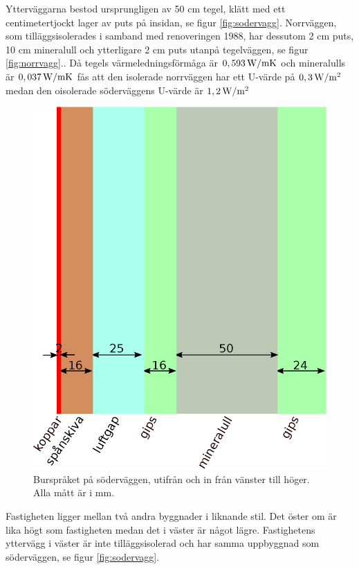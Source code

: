 Ytterväggarna bestod ursprungligen av 50 cm tegel, klätt med ett centimetertjockt lager av puts på insidan, se figur \ref{fig:sodervagg}. Norrväggen, som tilläggsisolerades i samband med renoveringen 1988, har dessutom 2 cm puts, 10 cm mineralull och ytterligare 2 cm puts utanpå tegelväggen, se figur \ref{fig:norrvagg}.\cite{kandidatarbete2010}\cite{petersarneo}. Då tegels värmeledningsförmåga är $\unit[0,593]{W/mK}$ och mineralulls är $\unit[0,037]{W/mK}$ fås att den isolerade norrväggen har ett U-värde på $\unit[0,3]{W/m^2}$ medan den oisolerade söderväggens U-värde är $\unit[1,2]{W/m^2}$

\begin{figure}[hpbt]
\centering
\includegraphics[width=0.3\textheight]{images/bursprak.eps}
\caption{\label{fig:bursprak}{Burspråket på söderväggen, utifrån och in från vänster till höger. Alla mått är i mm.}}
\end{figure}

Fastigheten ligger mellan två andra byggnader i liknande stil. Det öster om är lika högt som fastigheten medan det i väster är något lägre. Fastighetens yttervägg i väster är inte tilläggsisolerad och har samma uppbyggnad som söderväggen, se figur \ref{fig:sodervagg}.

